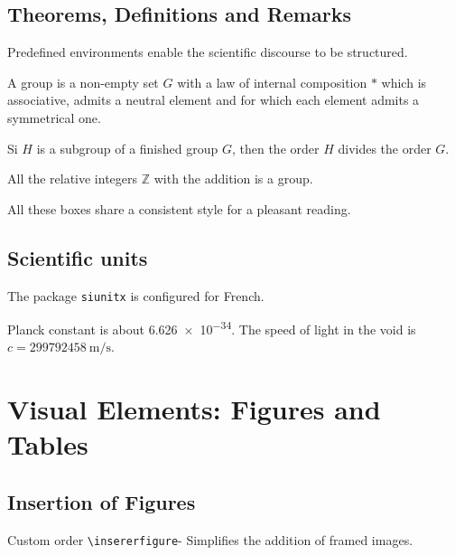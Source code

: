 \documentclass{mytex}
\begin{document}

\subsection{Theorems, Definitions and Remarks}
Predefined environments enable the scientific discourse to be structured.

\begin{definition}[Group]
	A group is a non-empty set $G$ with a law of internal composition $\ast$ which is associative, admits a neutral element and for which each element admits a symmetrical one.
\end{definition}

\begin{theorem}
	Si $H$ is a subgroup of a finished group $G$, then the order $H$ divides the order $G$.
\end{theorem}

\begin{exemple}
	All the relative integers $\mathbb{Z}$ with the addition is a group.
\end{exemple}

\begin{remarque}
	All these boxes share a consistent style for a pleasant reading.
\end{remarque}

\subsection{Scientific units}
The package \texttt{siunitx} is configured for French.

Planck constant  is about \num{6.626e-34}. The speed of light in the void is $c = \SI{299792458}{\meter\per\second}$.

\section{Visual Elements: Figures and Tables}

\subsection{Insertion of Figures}
Custom order \verb|\insererfigure|- Simplifies the addition of framed images.
\end{document}
